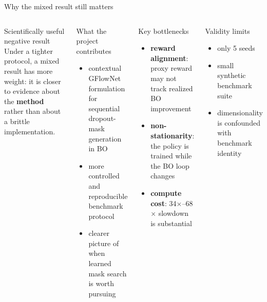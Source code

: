 \documentclass[aspectratio=169]{beamer}
\begin{document}
\begin{frame}{Why the mixed result still matters}
\vspace{-0.55em}
\begin{columns}[T,onlytextwidth]
\begin{minipage}[t][0.82\textheight]{\linewidth}\vspace{0pt}
  \begin{cardA}{Scientifically useful negative result}
  Under a tighter protocol, a mixed result has more weight: it is closer to evidence about the \textbf{method} rather than about a brittle implementation.
  \end{cardA}

  \vfill

  \begin{card}{What the project contributes}
  \begin{itemize}
    \item contextual GFlowNet formulation for sequential dropout-mask generation in BO
    \item more controlled and reproducible benchmark protocol
    \item clearer picture of when learned mask search is worth pursuing
  \end{itemize}
  \end{card}
\end{minipage}

\begin{minipage}[t][0.82\textheight]{\linewidth}\vspace{0pt}
  \begin{cardW}{Key bottlenecks}
  \begin{itemize}
    \item \textbf{reward alignment}: proxy reward may not track realized BO improvement
    \item \textbf{non-stationarity}: the policy is trained while the BO loop changes
    \item \textbf{compute cost}: 34$\times$--68$\times$ slowdown is substantial
  \end{itemize}
  \end{cardW}

  \vfill

  \begin{card}{Validity limits}
  \begin{itemize}
    \item only 5 seeds
    \item small synthetic benchmark suite
    \item dimensionality is confounded with benchmark identity
  \end{itemize}
  \end{card}
\end{minipage}
\end{columns}
\end{frame}
\end{document}
